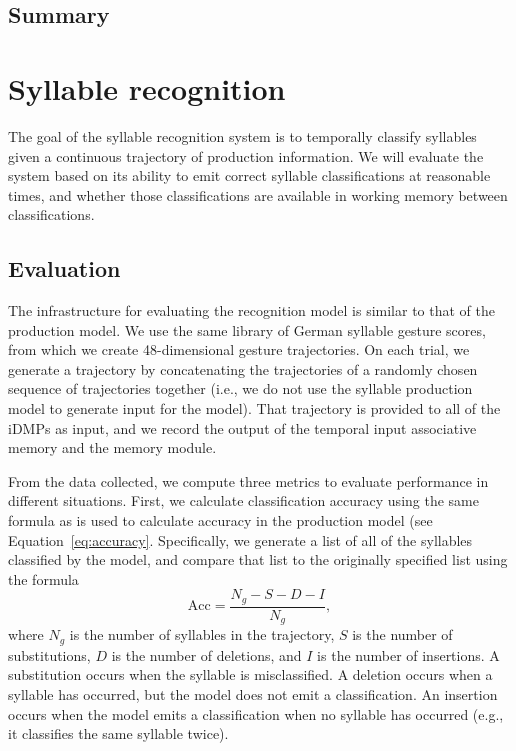 \subsection{Summary}


\section{Syllable recognition}

The goal of the syllable recognition system
is to temporally classify syllables
given a continuous trajectory
of production information.
We will evaluate the system
based on its ability to emit
correct syllable classifications
at reasonable times,
and whether those classifications
are available in working memory
between classifications.

\subsection{Evaluation}

The infrastructure for evaluating
the recognition model
is similar to that of the production model.
We use the same library
of German syllable gesture scores,
from which we create
48-dimensional gesture trajectories.
On each trial,
we generate a trajectory
by concatenating the trajectories
of a randomly chosen sequence
of trajectories together
(i.e., we do not use the
syllable production model
to generate input for the model).
That trajectory is provided
to all of the iDMPs as input,
and we record the output of the
temporal input associative memory
and the memory module.

From the data collected,
we compute three metrics
to evaluate performance
in different situations.
First, we calculate
classification accuracy
using the same formula
as is used to calculate
accuracy in the production model
(see Equation~\eqref{eq:accuracy}.
Specifically,
we generate a list of all of the
syllables classified by the model,
and compare that list to the
originally specified list
using the formula
\begin{equation}
  \text{Acc} = \frac{N_g - S - D - I}{N_g},
\end{equation}
where $N_g$ is the number of syllables
in the trajectory,
$S$ is the number of substitutions,
$D$ is the number of deletions,
and $I$ is the number of insertions.
A substitution occurs when
the syllable is misclassified.
A deletion occurs when
a syllable has occurred,
but the model does not emit a classification.
An insertion occurs
when the model emits a classification
when no syllable has occurred
(e.g., it classifies the same syllable twice).

